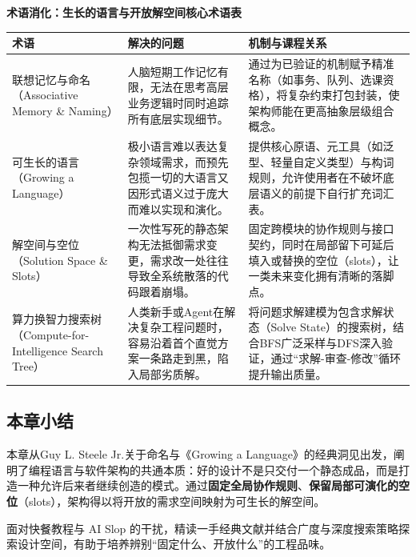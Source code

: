 \documentclass[UTF8,a4paper,11pt,fontset=fandol]{ctexart}
\begin{document}
\par{}\textbf{术语消化：生长的语言与开放解空间核心术语表}

\begin{center}\small\begin{tabularx}{\linewidth}{YYY}

\toprule

术语 & 解决的问题 & 机制与课程关系\\\midrule

联想记忆与命名（Associative Memory \& Naming） & 人脑短期工作记忆有限，无法在思考高层业务逻辑时同时追踪所有底层实现细节。 & 通过为已验证的机制赋予精准名称（如事务、队列、选课资格），将复杂约束打包封装，使架构师能在更高抽象层级组合概念。\\[3pt]

可生长的语言（Growing a Language） & 极小语言难以表达复杂领域需求，而预先包揽一切的大语言又因形式语义过于庞大而难以实现和演化。 & 提供核心原语、元工具（如泛型、轻量自定义类型）与构词规则，允许使用者在不破坏底层语义的前提下自行扩充词汇表。\\[3pt]

解空间与空位（Solution Space \& Slots） & 一次性写死的静态架构无法抵御需求变更，需求改一处往往导致全系统散落的代码跟着崩塌。 & 固定跨模块的协作规则与接口契约，同时在局部留下可延后填入或替换的空位（slots），让一类未来变化拥有清晰的落脚点。\\[3pt]

算力换智力搜索树（Compute-for-Intelligence Search Tree） & 人类新手或Agent在解决复杂工程问题时，容易沿着首个直觉方案一条路走到黑，陷入局部劣质解。 & 将问题求解建模为包含求解状态（Solve State）的搜索树，结合BFS广泛采样与DFS深入验证，通过“求解-审查-修改”循环提升输出质量。\\[3pt]

\bottomrule\end{tabularx}\end{center}

\subsection{本章小结}

本章从Guy L. Steele Jr.关于命名与《Growing a Language》的经典洞见出发，阐明了编程语言与软件架构的共通本质：好的设计不是只交付一个静态成品，而是打造一种允许后来者继续创造的模式。通过\textbf{固定全局协作规则}、\textbf{保留局部可演化的空位}（slots），架构得以将开放的需求空间映射为可生长的解空间。

面对快餐教程与 AI Slop 的干扰，精读一手经典文献并结合广度与深度搜索策略探索设计空间，有助于培养辨别“固定什么、开放什么”的工程品味。
\end{document}
